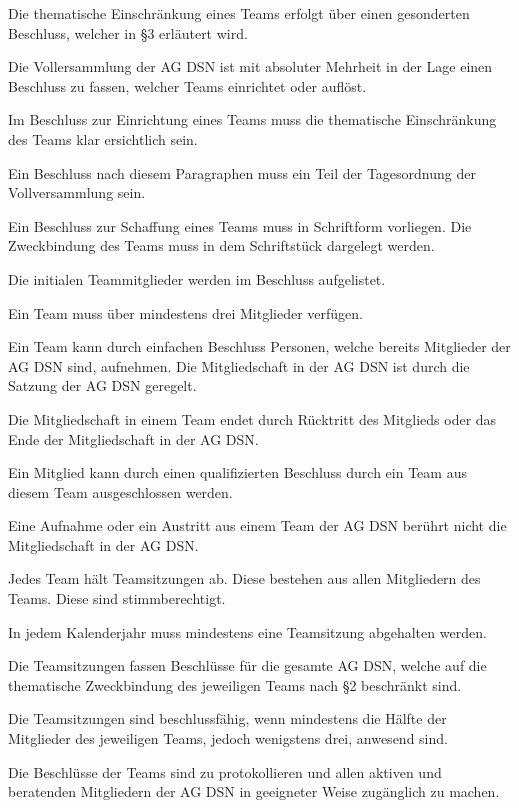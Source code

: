 \begin{contract}
Die thematische Einschränkung eines Teams erfolgt über einen gesonderten Beschluss, welcher in §3 erläutert wird.

Die Vollersammlung der AG DSN ist mit absoluter Mehrheit in der Lage einen Beschluss zu fassen, welcher Teams einrichtet oder auflöst.

Im Beschluss zur Einrichtung eines Teams muss die thematische Einschränkung des Teams klar ersichtlich sein.

Ein Beschluss nach diesem Paragraphen muss ein Teil der Tagesordnung der Vollversammlung sein.

Ein Beschluss zur Schaffung eines Teams muss in Schriftform vorliegen. Die Zweckbindung des Teams muss in dem Schriftstück dargelegt werden.

Die initialen Teammitglieder werden im Beschluss aufgelistet.

Ein Team muss über mindestens drei Mitglieder verfügen.


Ein Team kann durch einfachen Beschluss Personen, welche bereits Mitglieder der AG DSN sind, aufnehmen. Die Mitgliedschaft in der AG DSN ist durch die Satzung der AG DSN geregelt.

Die Mitgliedschaft in einem Team endet durch Rücktritt des Mitglieds oder das Ende der Mitgliedschaft in der AG DSN.

Ein Mitglied kann durch einen qualifizierten Beschluss durch ein Team aus diesem Team ausgeschlossen werden.

Eine Aufnahme oder ein Austritt aus einem Team der AG DSN berührt nicht die Mitgliedschaft in der AG DSN.


Jedes Team hält Teamsitzungen ab. Diese bestehen aus allen Mitgliedern des Teams. Diese sind stimmberechtigt.

In jedem Kalenderjahr muss mindestens eine Teamsitzung abgehalten werden.

Die Teamsitzungen fassen Beschlüsse für die gesamte AG DSN, welche auf die thematische Zweckbindung des jeweiligen Teams nach §2 beschränkt sind.

Die Teamsitzungen sind beschlussfähig, wenn mindestens die Hälfte der Mitglieder des jeweiligen Teams, jedoch wenigstens drei, anwesend sind.

Die Beschlüsse der Teams sind zu protokollieren und allen aktiven und beratenden Mitgliedern der AG DSN in geeigneter Weise zugänglich zu machen.


\end{contract}
